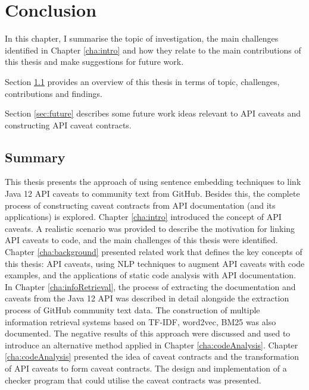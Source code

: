 \chapter{Conclusion}
\label{cha:conc}
In this chapter, I summarise the topic of investigation, the main challenges identified in Chapter \ref{cha:intro} and how they relate to the main contributions of this thesis and make suggestions for future work. \bigbreak

Section \ref{sec:summary} provides an overview of this thesis in terms of topic, challenges, contributions and findings.\bigbreak

Section \ref{sec:future} describes some future work ideas relevant to API caveats and constructing API caveat contracts.\bigbreak 

\section{Summary}
\label{sec:summary}
This thesis presents the approach of using sentence embedding techniques to link Java 12 API caveats to community text from GitHub. Besides this, the complete process of constructing caveat contracts from API documentation (and its applications) is explored. Chapter \ref{cha:intro} introduced the concept of API caveats. A realistic scenario was provided to describe the motivation for linking API caveats to code, and the main challenges of this thesis were identified. Chapter \ref{cha:background} presented related work that defines the key concepts of this thesis: API caveats, using NLP techniques to augment API caveats with code examples, and the applications of static code analysis with API documentation. In Chapter \ref{cha:infoRetrieval}, the process of extracting the documentation and caveats from the Java 12 API was described in detail alongside the extraction process of GitHub community text data. The construction of multiple information retrieval systems based on TF-IDF, word2vec, BM25 was also documented. The negative results of this approach were discussed and used to introduce an alternative method applied in Chapter \ref{cha:codeAnalysis}. Chapter \ref{cha:codeAnalysis} presented the idea of caveat contracts and the transformation of API caveats to form caveat contracts. The design and implementation of a checker program that could utilise the caveat contracts was presented.\bigbreak

